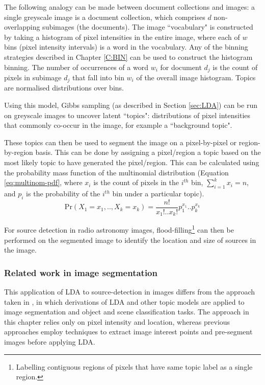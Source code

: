 The following analogy can be made between document collections and images: a single greyscale image is a document collection, which comprises $d$ non-overlapping subimages (the documents). The image ``vocabulary" is constructed by taking a histogram of pixel intensities in the entire image, where each of $w$ bins (pixel intensity intervals) is a word in the vocabulary. Any of the binning strategies described in Chapter \ref{C:BIN} can be used to construct the histogram binning. The number of occurrences of a word $w_i$ for document $d_j$ is the count of pixels in subimage $d_j$ that fall into bin $w_i$ of the overall image histogram. Topics are normalised distributions over bins.

Using this model, Gibbs sampling (as described in Section \ref{sec:LDA}) can be run on greyscale images to uncover latent ``topics": distributions of pixel intensities that commonly co-occur in the image, for example a ``background topic".

These topics can then be used to segment the image on a pixel-by-pixel or region-by-region basis. This can be done by assigning a pixel/region a topic based on the most likely topic to have generated the pixel/region. This can be calculated using the probability mass function of the multinomial distribution (Equation \ref{eq:multinom-pdf}, where $x_i$ is the count of pixels in the $i^{th}$ bin, $\sum_{i=1}^kx_i=n$, and $p_i$ is the probability of the $i^{th}$ bin under a particular topic). 
\begin{equation}
\mathrm{Pr}(X_1=x_1,..,X_k=x_k) = \frac{n!}{x_1!..x_k!}p_1^{x_1}..p_k^{x_k} 
\label{eq:multinom-pdf}
\end{equation}

For source detection in radio astronomy images, flood-filling\footnote{Labelling contiguous regions of pixels that have same topic label as a single region.} can then be performed on the segmented image to identify the location and size of sources in the image.

\subsubsection{Related work in image segmentation}

This application of LDA to source-detection in images differs from the approach taken in \cite{cao2007spatially,fei2005bayesian,fergus2005learning,quelhas2005modeling,russell2006using,sivic2005discovering2,sivic2005discovering,sudderth2005learning,wang2007spatial}, in which derivations of LDA and other topic models are applied to image segmentation and object and scene classification tasks. The approach in this chapter relies only on pixel intensity and location, whereas previous approaches employ techniques to extract image interest points and pre-segment images before applying LDA.

